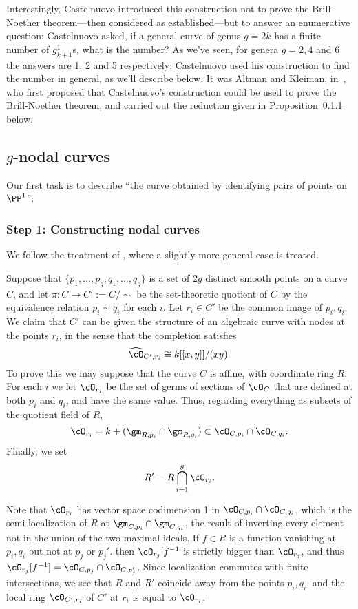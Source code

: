 Interestingly, Castelnuovo introduced this construction not to prove the Brill-Noether theorem---then considered as established---but to answer an enumerative question: Castelnuovo asked, if a general curve of genus $g = 2k$ has a finite number of $g^1_{k+1}$s, what is the number? As we've seen, for genera $g = 2, 4$ and 6 the answers are 1, 2 and 5 respectively; Castelnuovo used his construction to find the number in general, as we'll describe below. It was Altman and Kleiman, in~\cite{}, who first proposed that Castelnuovo's construction could be used to prove the Brill-Noether theorem, and carried out the reduction given in Proposition~\ref{} below.

\subsection{$g$-nodal curves}
Our first task is to describe ``the curve obtained by identifying pairs of points on $\PP^1$'':

\subsubsection{Step 1: Constructing nodal curves}
We follow the treatment of \cite{Serre, Corps locaux, pp70ff},
 where a slightly more general case is treated.
 
Suppose that $\{ p_1,\dots, p_g, q_1,\dots, q_g  \}$ is a set of $2g$ distinct smooth points on a curve $C$, and let $\pi: C \to C':=C/\sim$ be the set-theoretic quotient of $C$ by the equivalence relation
 $p_i\sim q_i$ for each $i$. Let $r_i\in C'$ be the common image of $p_i, q_i$. We claim that $C'$ can be given the structure of an  algebraic curve with nodes at the points $r_i$, in the sense that the completion satisfies
$$
\widehat\cO_{C', r_i} \cong k[[x,y]]/(xy).
$$
 To prove this we may suppose that the curve $C$ is affine, with coordinate ring $R$.
For each $i$ we let $\cO_{r_i}$  be the set of germs of sections of $\cO_C$ that are
 defined at both $p_i$ and $q_i$, and have the same value. Thus, regarding everything
 as subsets of the quotient field of $R$, 
 $$
 \cO_{r_i} = k+(\gm_{R,p_i} \cap \gm_{R,q_i}) \subset \cO_{C,p_i}\cap \cO_{C,q_i}.
 $$
 Finally, we set 
 $$
 R' = R \bigcap_{i=1}^g \cO_{r_i}.
 $$

Note that $\cO_{r_i}$ has vector space codimension 1 in 
 $\cO_{C,p_i}\cap \cO_{C,q_i}$, which is the semi-localization of $R$ at
 $\gm_{C,p_i}\cap \gm_{C,q_i}$, the result of inverting every element not in the 
 union of the two maximal ideals. If $f\in R$ is a function vanishing at $p_i, q_i$ but not at $p_j$ or $p_j'$.
then $\cO_{r_j}[f^{-1}$ is strictly bigger than
$\cO_{r_j}$, and thus $\cO_{r_j} [f^{-1}] = \cO_{C,p_j} \cap \cO_{C,p_j'}$.
Since localization commutes with finite intersections, we see that $R$ and $R'$
coincide away from the points $p_i,q_i$, and the local ring $\cO_{C',r_i}$ of $C'$ at $r_i$ is
equal to $\cO_{r_i}$.

